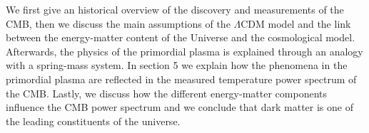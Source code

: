 \documentclass{article}
\begin{document}
We first give an historical overview of the discovery and measurements of the CMB, then we discuss the main assumptions of the $\Lambda$CDM model and the link between the energy-matter content of the Universe and the cosmological model. 
Afterwards, the physics of the primordial plasma is explained through an analogy with a spring-mass system.
In section 5 we explain how the phenomena in the primordial plasma are reflected in the measured temperature power spectrum of the CMB.
Lastly, we discuss how the different energy-matter components influence the CMB power spectrum and we conclude that dark matter is one of the leading constituents of the universe.


\pagebreak
\end{document}
